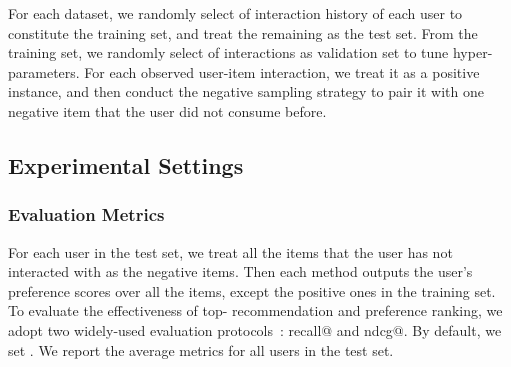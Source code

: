 \documentclass[sigconf]{acmart}
\theoremstyle{definition}
\begin{document}
For each dataset, we randomly select  of interaction history of each user to constitute the training set, and treat the remaining as the test set.
From the training set, we randomly select  of interactions as validation set to tune hyper-parameters.
For each observed user-item interaction, we treat it as a positive instance, and then conduct the negative sampling strategy to pair it with one negative item that the user did not consume before.

\subsection{Experimental Settings}

\begin{table}[t]
\caption{Statistics of the datasets.}
\vspace{-10px}
\label{tab:dataset}
\vspace{-15px}
\end{table}

\subsubsection{\textbf{Evaluation Metrics}}
For each user in the test set, we treat all the items that the user has not interacted with as the negative items.
Then each method outputs the user's preference scores over all the items, except the positive ones in the training set.
To evaluate the effectiveness of top- recommendation and preference ranking, we adopt two widely-used evaluation protocols~\cite{NCF,HOP-rec}: recall@ and ndcg@.
By default, we set .
We report the average metrics for all users in the test set.
\end{document}
